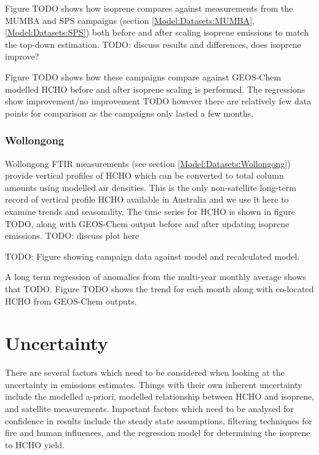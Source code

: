      Figure TODO shows how isoprene compares against measurements from the MUMBA and SPS campaigns (section \ref{Model:Datasets:MUMBA}, \ref{Model:Datasets:SPS}) both before and after scaling isoprene emissions to match the top-down estimation.
      TODO: discuss results and differences, does isoprene improve?
      
      Figure TODO shows how these campaigns compare against GEOS-Chem modelled HCHO before and after isoprene scaling is performed. The regressions show improvement/no improvement TODO however there are relatively few data points for comparison as the campaigns only lasted a few months.
    
    \subsubsection{Wollongong}
      Wollongong FTIR measurements (see section \ref{Model:Datasets:Wollongong}) provide vertical profiles of HCHO which can be converted to total column amounts using modelled air densities.
      This is the only non-satellite long-term record of vertical profile HCHO available in Australia and we use it here to examine trends and seasonality.
      The time series for HCHO is shown in figure TODO, along with GEOS-Chem output before and after updating isoprene emissions.
      TODO: discuss plot here
      
      TODO: Figure showing campaign data against model and recalculated model.
      
      A long term regression of anomalies from the multi-year monthly average shows that TODO.
      Figure TODO shows the trend for each month along with co-located HCHO from GEOS-Chem outputs.

\section{Uncertainty}
\label{BioIsop:Uncertainty}

  There are several factors which need to be considered when looking at the uncertainty in emissions estimates.
  Things with their own inherent uncertainty include the modelled a-priori, modelled relationship between HCHO and isoprene, and satellite measurements.
  Important factors which need to be analysed for confidence in results include the steady state assumptions, filtering techniques for fire and human influences, and the regression model for determining the isoprene to HCHO yield.
  
